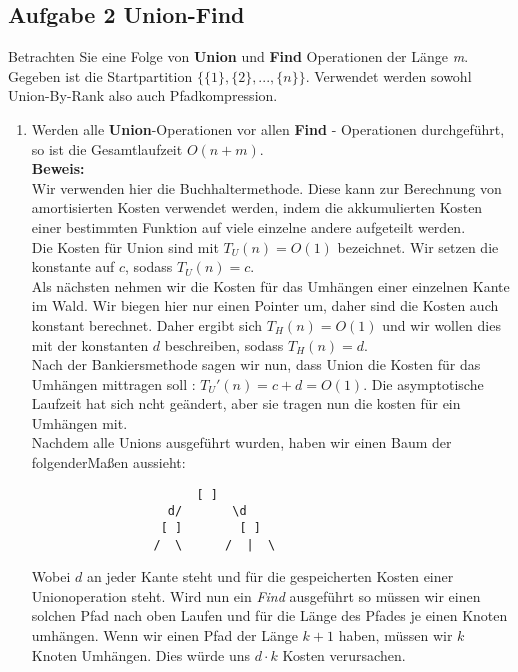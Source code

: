 \documentclass[11pt,a4paper,ngerman]{article}
\begin{document}
\subsection*{Aufgabe 2 \mdseries Union-Find}

Betrachten Sie eine Folge von \textbf{Union} und \textbf{Find} Operationen der Länge \emph{m}. Gegeben ist die Startpartition $\{\{ 1 \} , \{ 2 \} , ... , \{ n \} \}$. Verwendet werden sowohl Union-By-Rank also auch Pfadkompression.

\begin{enumerate}[\bfseries (a)]

\item Werden alle \textbf{Union}-Operationen vor allen \textbf{Find} - Operationen durchgeführt, so ist die Gesamtlaufzeit $O(n + m)$.\\

\textbf{Beweis:}\\

Wir verwenden hier die Buchhaltermethode. Diese kann zur Berechnung von amortisierten Kosten verwendet werden, indem die akkumulierten Kosten einer bestimmten Funktion auf viele einzelne andere aufgeteilt werden.\\

Die Kosten für Union sind mit $T_U(n) = O(1)$ bezeichnet. Wir setzen die konstante auf $c$, sodass $T_U(n) = c$.\\

Als nächsten nehmen wir die Kosten für das Umhängen einer einzelnen Kante im Wald. Wir biegen hier nur einen Pointer um, daher sind die Kosten auch konstant berechnet. Daher ergibt sich $T_H(n) = O(1)$ und wir wollen dies mit der konstanten $d$ beschreiben, sodass $T_H(n) = d$.\\

Nach der Bankiersmethode sagen wir nun, dass Union die Kosten für das Umhängen mittragen soll : $T_U'(n) = c + d = O(1)$. Die asymptotische Laufzeit hat sich ncht geändert, aber sie tragen nun die kosten für ein Umhängen mit.\\

Nachdem alle Unions ausgeführt wurden, haben wir einen Baum der folgenderMaßen aussieht:
\begin{lstlisting}
                       [ ]
                   d/       \d
                  [ ]        [ ]
                 /  \      /  |  \
\end{lstlisting}
Wobei $d$ an jeder Kante steht und für die gespeicherten Kosten einer Unionoperation steht. Wird nun ein \emph{Find} ausgeführt so müssen wir einen solchen Pfad nach oben Laufen und für die Länge des Pfades je einen Knoten umhängen. Wenn wir einen Pfad der Länge $k+1$ haben, müssen wir $k$ Knoten Umhängen. Dies würde uns $d\cdot k$ Kosten verursachen.\\


\end{enumerate}
\end{document}
